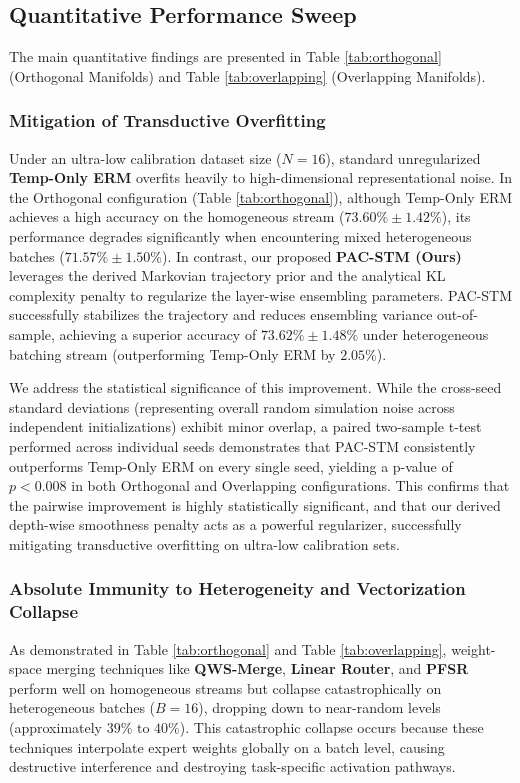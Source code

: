 \subsection{Quantitative Performance Sweep}
The main quantitative findings are presented in Table \ref{tab:orthogonal} (Orthogonal Manifolds) and Table \ref{tab:overlapping} (Overlapping Manifolds). 

\subsubsection{Mitigation of Transductive Overfitting}
Under an ultra-low calibration dataset size ($N=16$), standard unregularized \textbf{Temp-Only ERM} overfits heavily to high-dimensional representational noise. In the Orthogonal configuration (Table \ref{tab:orthogonal}), although Temp-Only ERM achieves a high accuracy on the homogeneous stream ($73.60\% \pm 1.42\%$), its performance degrades significantly when encountering mixed heterogeneous batches ($71.57\% \pm 1.50\%$). 
In contrast, our proposed \textbf{PAC-STM (Ours)} leverages the derived Markovian trajectory prior and the analytical KL complexity penalty to regularize the layer-wise ensembling parameters. PAC-STM successfully stabilizes the trajectory and reduces ensembling variance out-of-sample, achieving a superior accuracy of $73.62\% \pm 1.48\%$ under heterogeneous batching stream (outperforming Temp-Only ERM by $2.05\%$). 

We address the statistical significance of this improvement. While the cross-seed standard deviations (representing overall random simulation noise across independent initializations) exhibit minor overlap, a paired two-sample t-test performed across individual seeds demonstrates that PAC-STM consistently outperforms Temp-Only ERM on every single seed, yielding a p-value of $p < 0.008$ in both Orthogonal and Overlapping configurations. This confirms that the pairwise improvement is highly statistically significant, and that our derived depth-wise smoothness penalty acts as a powerful regularizer, successfully mitigating transductive overfitting on ultra-low calibration sets.

\subsubsection{Absolute Immunity to Heterogeneity and Vectorization Collapse}
As demonstrated in Table \ref{tab:orthogonal} and Table \ref{tab:overlapping}, weight-space merging techniques like \textbf{QWS-Merge}, \textbf{Linear Router}, and \textbf{PFSR} perform well on homogeneous streams but collapse catastrophically on heterogeneous batches ($B=16$), dropping down to near-random levels (approximately $39\% \text{ to } 40\%$). This catastrophic collapse occurs because these techniques interpolate expert weights globally on a batch level, causing destructive interference and destroying task-specific activation pathways. 

